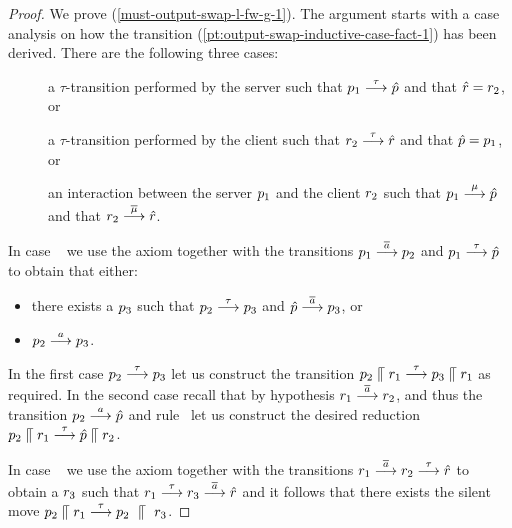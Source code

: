 \begin{proof}
  We prove (\ref{must-output-swap-l-fw-g-1}). The argument starts with
  a case analysis on how the transition
  (\ref{pt:output-swap-inductive-case-fact-1}) has been derived.
  There are the following three cases:
    \begin{description}
  \item[\stauserver]
    \label{must-output-swap-l-fw-g-1-1}
    \label{pt:must-output-proof-of-i-stauserver}
    a $\tau$-transition performed by the server such that
    $p_1 \mathrel{\overset{\tau}\longrightarrow} \hat{p}$ and that $\hat{r} = r_2$, or
  \item[\stauclient]
    \label{must-output-swap-l-fw-g-1-2}
    \label{pt:must-output-proof-of-i-stauclient}
    a $\tau$-transition performed by the client such that
    $r_2 \mathrel{\overset{\tau}\longrightarrow} \hat{r}$ and that $\hat{p} = p_1$, or
  \item[\scom]
    \label{must-output-swap-l-fw-g-1-3}
    \label{pt:must-output-proof-of-i-scom}
    an interaction between the server $p_1$ and the client
    $r_2$ such that 
    $p_1 \mathrel{\overset{\mu}\longrightarrow} \hat{p}$ and that $r_2 \mathrel{\overset{\overline{\mu}}\longrightarrow} \hat{r}$.
    \end{description}


    In case \stauserver\ %
    we use the \outputtau axiom together with
    the transitions $p_1 \mathrel{\overset{\overline{a}}\longrightarrow} p_2$ and
    $p_1 \mathrel{\overset{\tau}\longrightarrow} \hat{p}$
    to obtain that either:
    \begin{itemize}
  \item
    there exists a $p_3$ such that $p_2 \mathrel{\overset{\tau}\longrightarrow} p_3$ and
    $\hat{p} \mathrel{\overset{\overline{a}}\longrightarrow} p_3$, or
  \item
    $p_2 \mathrel{\overset{a}\longrightarrow} p_3$.
  \end{itemize}
    In the first case $p_2 \mathrel{\overset{\tau}\longrightarrow} p_3$ let us construct the transition
  $p_2 \mathrel{\llceil} r_1 \mathrel{\overset{\tau}\longrightarrow} p_3 \mathrel{\llceil} r_1$ as required.
    In the second case recall that by hypothesis $r_1 \mathrel{\overset{\overline{a}}\longrightarrow}
  r_2$, and thus the transition  $p_2 \mathrel{\overset{a}\longrightarrow}
  \hat{p}$ and rule \scom\ let us construct the desired reduction
    $p_2 \mathrel{\llceil} r_1 \mathrel{\overset{\tau}\longrightarrow} \hat{p} \mathrel{\llceil} r_2$.


  In case \stauclient\ %
  we use the \outputcommutativity axiom together with
  the transitions $r_1 \mathrel{\overset{\overline{a}}\longrightarrow} r_2 \mathrel{\overset{\tau}\longrightarrow} \hat{r}$
  to obtain a $r_3$ such that $r_1 \mathrel{\overset{\tau}\longrightarrow} r_3 \mathrel{\overset{\overline{a}}\longrightarrow} \hat{r}$
  and it follows that there exists the silent move $p_2 \mathrel{\llceil} r_1 \mathrel{\overset{\tau}\longrightarrow} p_2~ \mathrel{\llceil} ~r_3$.


\end{proof}
